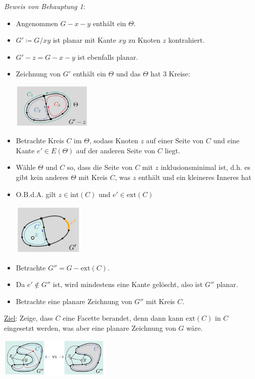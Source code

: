 \textit{Beweis von Behauptung 1}:
\begin{itemize}
	\item Angenommen $G-x-y$ enthält ein $\Theta$.
	\item $G'\coloneqq G/xy$ ist planar mit Kante $xy$ zu Knoten $z$ kontrahiert.
	\item $G'-z=G-x-y$ ist ebenfalls planar.
	\item Zeichnung von $G'$ enthält ein $\Theta$ und das $\Theta$ hat 3 Kreise:
	\begin{center}
		\includegraphics[width=0.3\textwidth]{images/wagner-2.png}
	\end{center}
	\item Betrachte Kreis $C$ im $\Theta$, sodass Knoten $z$ auf einer Seite von $C$ und eine Kante $e'\in E(\Theta)$ auf der anderen Seite von $C$ liegt.
	\item Wähle $\Theta$ und $C$ so, dass die Seite von $C$ mit $z$ inklusionsminimal ist, d.h. es gibt kein anderes $\Theta$ mit Kreis $C$, was $z$ enthält und ein kleineres Inneres hat
	\item O.B.d.A. gilt $z\in\text{int}(C)$ und $e'\in\text{ext}(C)$
	\begin{center}
		\includegraphics[width=0.27\textwidth]{images/wagner-3.png}
	\end{center}
	\item Betrachte $G''=G-\text{ext}(C)$.
	\item Da $e'\notin G''$ ist, wird mindestens eine Kante gelöscht, also ist $G''$ planar.
	\item Betrachte eine planare Zeichnung von $G''$ mit Kreis $C$.
\end{itemize}

\underline{Ziel}: Zeige, dass $C$ eine Facette berandet, denn dann kann $\text{ext}(C)$ in $C$ eingesetzt werden, was aber eine planare Zeichnung von $G$ wäre. \Lightning
\begin{center}
	\includegraphics[width=0.4\textwidth]{images/wagner-4.png}
\end{center}

